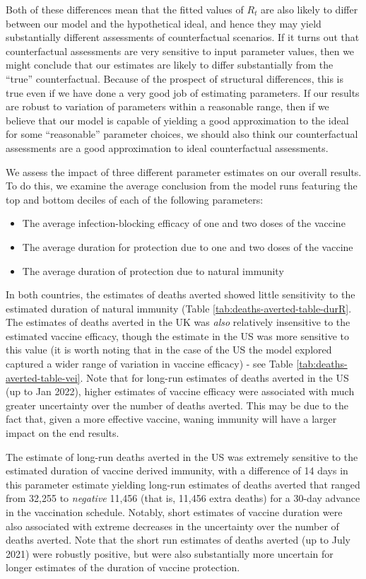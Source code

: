 \documentclass{article}
\providecommand{\tightlist}{%
  \setlength{\itemsep}{0pt}\setlength{\parskip}{0pt}}
\begin{document}
Both of these differences mean that the fitted values of \(R_t\) are also likely to differ between our model and the hypothetical ideal, and hence they may yield substantially different assessments of counterfactual scenarios. If it turns out that counterfactual assessments are very sensitive to input parameter values, then we might conclude that our estimates are likely to differ substantially from the ``true'' counterfactual. Because of the prospect of structural differences, this is true even if we have done a very good job of estimating parameters. If our results are robust to variation of parameters within a reasonable range, then if we believe that our model is capable of yielding a good approximation to the ideal for some ``reasonable'' parameter choices, we should also think our counterfactual assessments are a good approximation to ideal counterfactual assessments.

We assess the impact of three different parameter estimates on our overall results. To do this, we examine the average conclusion from the model runs featuring the top and bottom deciles of each of the following parameters:

\begin{itemize}
\tightlist
\item
  The average infection-blocking efficacy of one and two doses of the vaccine
\item
  The average duration for protection due to one and two doses of the vaccine
\item
  The average duration of protection due to natural immunity
\end{itemize}

In both countries, the estimates of deaths averted showed little sensitivity to the estimated duration of natural immunity (Table \ref{tab:deaths-averted-table-durR}. The estimates of deaths averted in the UK was \emph{also} relatively insensitive to the estimated vaccine efficacy, though the estimate in the US was more sensitive to this value (it is worth noting that in the case of the US the model explored captured a wider range of variation in vaccine efficacy) - see Table \ref{tab:deaths-averted-table-vei}. Note that for long-run estimates of deaths averted in the US (up to Jan 2022), higher estimates of vaccine efficacy were associated with much greater uncertainty over the number of deaths averted. This may be due to the fact that, given a more effective vaccine, waning immunity will have a larger impact on the end results.

The estimate of long-run deaths averted in the US was extremely sensitive to the estimated duration of vaccine derived immunity, with a difference of 14 days in this parameter estimate yielding long-run estimates of deaths averted that ranged from 32,255 to \emph{negative} 11,456 (that is, 11,456 extra deaths) for a 30-day advance in the vaccination schedule. Notably, short estimates of vaccine duration were also associated with extreme decreases in the uncertainty over the number of deaths averted. Note that the short run estimates of deaths averted (up to July 2021) were robustly positive, but were also substantially more uncertain for longer estimates of the duration of vaccine protection.
\end{document}
